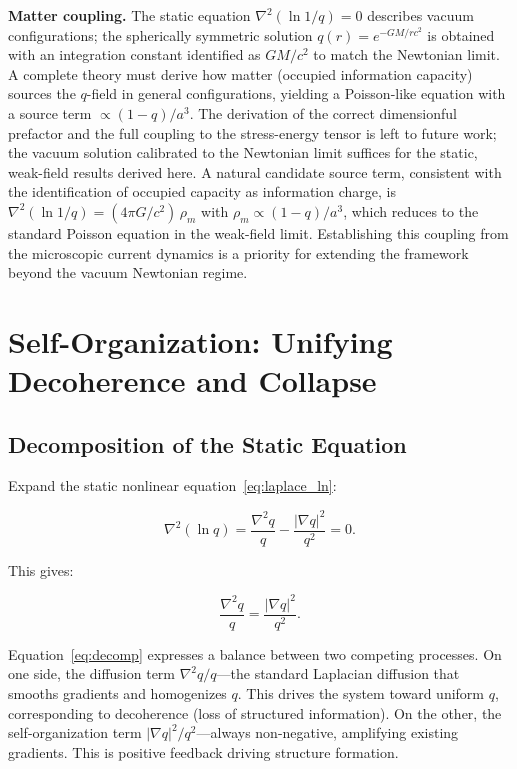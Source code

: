 \documentclass[aps,prd,twocolumn,showpacs,superscriptaddress,preprintnumbers]{revtex4-2}
\begin{document}
\textbf{Matter coupling.}
The static equation $\nabla^2(\ln 1/q)=0$ describes vacuum configurations; the spherically symmetric solution $q(r)=e^{-GM/rc^2}$ is obtained with an integration constant identified as $GM/c^2$ to match the Newtonian limit.
A complete theory must derive how matter (occupied information capacity) sources the $q$-field in general configurations, yielding a Poisson-like equation with a source term $\propto(1-q)/a^3$.
The derivation of the correct dimensionful prefactor and the full coupling to the stress-energy tensor is left to future work; the vacuum solution calibrated to the Newtonian limit suffices for the static, weak-field results derived here.
A natural candidate source term, consistent with the identification of occupied capacity as information charge, is $\nabla^2(\ln 1/q) = (4\pi G/c^2)\,\rho_m$ with $\rho_m \propto (1-q)/a^3$, which reduces to the standard Poisson equation in the weak-field limit.
Establishing this coupling from the microscopic current dynamics is a priority for extending the framework beyond the vacuum Newtonian regime.

\section{Self-Organization: Unifying Decoherence and Collapse}
\label{sec:selforg}

\subsection{Decomposition of the Static Equation}

Expand the static nonlinear equation~\eqref{eq:laplace_ln}:

\begin{equation}
\nabla^2(\ln q) = \frac{\nabla^2 q}{q} - \frac{|\nabla q|^2}{q^2} = 0.
\label{eq:expand_ln}
\end{equation}

This gives:

\begin{equation}
\boxed{\frac{\nabla^2 q}{q} = \frac{|\nabla q|^2}{q^2}}.
\label{eq:decomp}
\end{equation}

Equation~\eqref{eq:decomp} expresses a balance between two competing processes.
On one side, the diffusion term $\nabla^2 q/q$---the standard Laplacian diffusion that smooths gradients and homogenizes $q$.
This drives the system toward uniform $q$, corresponding to decoherence (loss of structured information).
On the other, the self-organization term $|\nabla q|^2/q^2$---always non-negative, amplifying existing gradients.
This is positive feedback driving structure formation.
\end{document}
